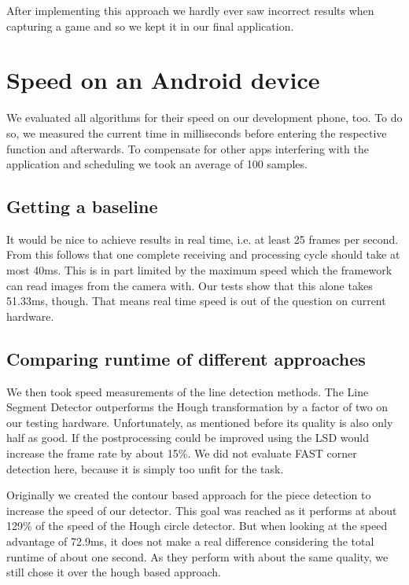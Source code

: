 	After implementing this approach we hardly ever saw incorrect results when capturing a game and so we kept it in our final application.






	\section{Speed on an Android device}
	\label{evaluation-speed}
	We evaluated all algorithms for their speed on our development phone, too. To do so, we measured the current time in milliseconds before entering the respective function and afterwards. To compensate for other apps interfering with the application and scheduling we took an average of 100 samples.

	\subsection{Getting a baseline}
	\label{evaluation-speed-baseline}
	It would be nice to achieve results in real time, i.e. at least 25 frames per second. From this follows that one complete receiving and processing cycle should take at most 40ms. This is in part limited by the maximum speed which the framework can read images from the camera with. Our tests show that this alone takes 51.33ms, though. That means real time speed is out of the question on current hardware.

	\subsection{Comparing runtime of different approaches}
	\label{evaluation-speed-approaches}
	We then took speed measurements of the line detection methods. The Line Segment Detector outperforms the Hough transformation by a factor of two on our testing hardware. Unfortunately, as mentioned before its quality is also only half as good. If the postprocessing could be improved using the LSD would increase the frame rate by about 15\%. We did not evaluate FAST corner detection here, because it is simply too unfit for the task.

	Originally we created the contour based approach for the piece detection to increase the speed of our detector. This goal was reached as it performs at about 129\% of the speed of the Hough circle detector. But when looking at the speed advantage of 72.9ms, it does not make a real difference considering the total runtime of about one second. As they perform with about the same quality, we still chose it over the hough based approach.

